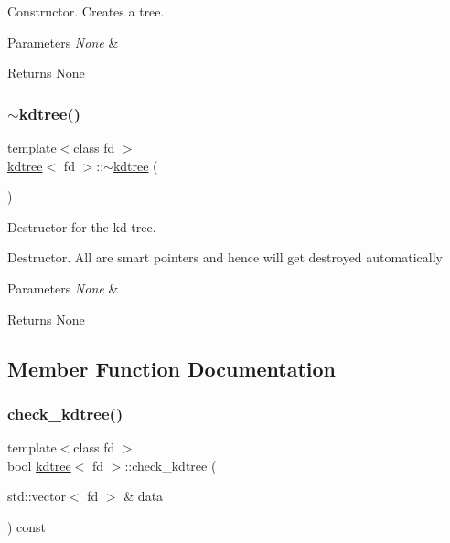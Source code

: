 Constructor. Creates a tree.


\begin{DoxyParams}{Parameters}
{\em None} & \\
\hline
\end{DoxyParams}
\begin{DoxyReturn}{Returns}
None 
\end{DoxyReturn}
\mbox{\label{classkdtree_aed5e97fa78a51ce22c83874f5ccfc91a}} 
\subsubsection{\texorpdfstring{$\sim$kdtree()}{~kdtree()}}
{\footnotesize\ttfamily template$<$class fd $>$ \\
\hyperlink{classkdtree}{kdtree}$<$ fd $>$\+::$\sim$\hyperlink{classkdtree}{kdtree} (\begin{DoxyParamCaption}{ }\end{DoxyParamCaption})}



Destructor for the kd tree. 

Destructor. All are smart pointers and hence will get destroyed automatically


\begin{DoxyParams}{Parameters}
{\em None} & \\
\hline
\end{DoxyParams}
\begin{DoxyReturn}{Returns}
None 
\end{DoxyReturn}


\subsection{Member Function Documentation}
\mbox{\label{classkdtree_a8d48dc9f9e08bf609b94bd6721ef9cbd}} 
\subsubsection{\texorpdfstring{check\+\_\+kdtree()}{check\_kdtree()}\hspace{0.1cm}{\footnotesize\ttfamily [1/2]}}
{\footnotesize\ttfamily template$<$class fd $>$ \\
bool \hyperlink{classkdtree}{kdtree}$<$ fd $>$\+::check\+\_\+kdtree (\begin{DoxyParamCaption}\item[{std\+::vector$<$ fd $>$ \&}]{data }\end{DoxyParamCaption}) const}



